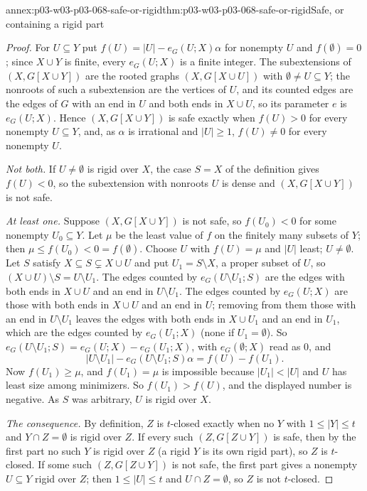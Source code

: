 \begin{annexitem}{annex:p03-w03-p03-068-safe-or-rigid}{thm:p03-w03-p03-068-safe-or-rigid}{Safe, or containing a rigid part}
\begin{proof}
For \(U\subseteq Y\) put \(f(U)=|U|-e_G(U;X)\alpha\) for nonempty \(U\) and
\(f(\emptyset)=0\); since \(X\cup Y\) is finite, every \(e_G(U;X)\) is a
finite integer.  The subextensions of \((X,G[X\cup Y])\) are the rooted
graphs \((X,G[X\cup U])\) with \(\emptyset\neq U\subseteq Y\); the nonroots of
such a subextension are the vertices of \(U\), and its counted edges are the
edges of \(G\) with an end in \(U\) and both ends in \(X\cup U\), so its
parameter \(e\) is \(e_G(U;X)\).  Hence \((X,G[X\cup Y])\) is safe exactly
when \(f(U)>0\) for every nonempty \(U\subseteq Y\), and, as \(\alpha\) is
irrational and \(|U|\geq1\), \(f(U)\neq0\) for every nonempty \(U\).

\emph{Not both.}  If \(U\neq\emptyset\) is rigid over \(X\), the case \(S=X\)
of the definition gives \(f(U)<0\), so the subextension with nonroots \(U\) is
dense and \((X,G[X\cup Y])\) is not safe.

\emph{At least one.}  Suppose \((X,G[X\cup Y])\) is not safe, so \(f(U_0)<0\)
for some nonempty \(U_0\subseteq Y\).  Let \(\mu\) be the least value of \(f\)
on the finitely many subsets of \(Y\); then \(\mu\leq f(U_0)<0=f(\emptyset)\).
Choose \(U\) with \(f(U)=\mu\) and \(|U|\) least; \(U\neq\emptyset\).  Let
\(S\) satisfy \(X\subseteq S\subsetneq X\cup U\) and put \(U_1=S\setminus X\),
a proper subset of \(U\), so \((X\cup U)\setminus S=U\setminus U_1\).  The
edges counted by \(e_G(U\setminus U_1;S)\) are the edges with both ends in
\(X\cup U\) and an end in \(U\setminus U_1\).  The edges counted by
\(e_G(U;X)\) are those with both ends in \(X\cup U\) and an end in \(U\);
removing from them those with an end in \(U\setminus U_1\) leaves the edges
with both ends in \(X\cup U_1\) and an end in \(U_1\), which are the edges
counted by \(e_G(U_1;X)\) (none if \(U_1=\emptyset\)).  So
\(e_G(U\setminus U_1;S)=e_G(U;X)-e_G(U_1;X)\), with
\(e_G(\emptyset;X)\) read as \(0\), and
\[
  |U\setminus U_1|-e_G(U\setminus U_1;S)\alpha=f(U)-f(U_1).
\]
Now \(f(U_1)\geq\mu\), and \(f(U_1)=\mu\) is impossible because \(|U_1|<|U|\)
and \(U\) has least size among minimizers.  So \(f(U_1)>f(U)\), and the
displayed number is negative.  As \(S\) was arbitrary, \(U\) is rigid over
\(X\).

\emph{The consequence.}  By definition, \(Z\) is \(t\)-closed exactly when no
\(Y\) with \(1\leq|Y|\leq t\) and \(Y\cap Z=\emptyset\) is rigid over \(Z\).
If every such \((Z,G[Z\cup Y])\) is safe, then by the first part no such
\(Y\) is rigid over \(Z\) (a rigid \(Y\) is its own rigid part), so \(Z\) is
\(t\)-closed.  If some such \((Z,G[Z\cup Y])\) is not safe, the first part
gives a nonempty \(U\subseteq Y\) rigid over \(Z\); then
\(1\leq|U|\leq t\) and \(U\cap Z=\emptyset\), so \(Z\) is not \(t\)-closed.
\end{proof}
\end{annexitem}

